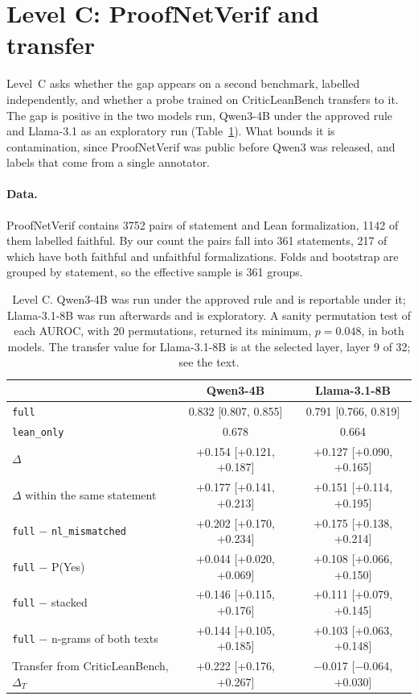 \documentclass[10pt]{article}
\newcommand{\vr}[1]{\texttt{#1}}
\newcommand{\D}{\Delta}
\begin{document}
\section{Level C: ProofNetVerif and transfer}\label{sec:c}

Level~C asks whether the gap appears on a second benchmark, labelled independently, and whether a probe trained on
CriticLeanBench transfers to it. The gap is positive in the two models run, Qwen3-4B under the approved rule and
Llama-3.1 as an exploratory run (Table~\ref{tab:c}). What bounds it is contamination, since ProofNetVerif was public
before Qwen3 was released, and labels that come from a single annotator.

\paragraph{Data.}
ProofNetVerif \citep{proofnetverif} contains 3752 pairs of statement and Lean formalization, 1142 of them labelled
faithful. By our count the pairs fall into 361 statements, 217 of which have both faithful and unfaithful formalizations.
Folds and bootstrap are grouped by statement, so the effective sample is 361 groups.

\begin{table}[h]
\centering
\caption{Level C. Qwen3-4B was run under the approved rule and is reportable under it; Llama-3.1-8B was run
afterwards and is exploratory. A sanity permutation test of each AUROC, with 20 permutations, returned its minimum, $p = 0.048$, in
both models. The transfer value for Llama-3.1-8B is at the selected layer, layer 9 of 32; see the text.}
\label{tab:c}
\vspace{2pt}
\begin{tabular}{@{}lcc@{}}
\toprule
 & Qwen3-4B & Llama-3.1-8B\\
\midrule
\vr{full}                               & 0.832 [0.807, 0.855] & 0.791 [0.766, 0.819]\\
\vr{lean\_only}                         & 0.678 & 0.664\\
$\D$                                    & +0.154 [+0.121, +0.187] & +0.127 [+0.090, +0.165]\\
$\D$ within the same statement          & +0.177 [+0.141, +0.213] & +0.151 [+0.114, +0.195]\\
\vr{full} $-$ \vr{nl\_mismatched}       & +0.202 [+0.170, +0.234] & +0.175 [+0.138, +0.214]\\
\vr{full} $-$ P(Yes)                    & +0.044 [+0.020, +0.069] & +0.108 [+0.066, +0.150]\\
\vr{full} $-$ stacked                 & +0.146 [+0.115, +0.176] & +0.111 [+0.079, +0.145]\\
\vr{full} $-$ n-grams of both texts       & +0.144 [+0.105, +0.185] & +0.103 [+0.063, +0.148]\\
\midrule
Transfer from CriticLeanBench, $\D_T$   & +0.222 [+0.176, +0.267] & −0.017 [−0.064, +0.030]\\
\bottomrule
\end{tabular}
\end{table}
\end{document}
